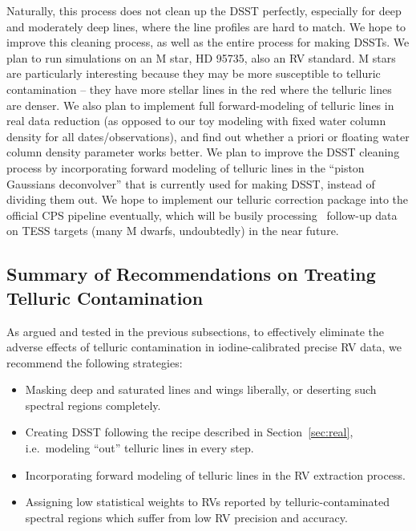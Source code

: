Naturally, this process does not clean up the DSST perfectly,
especially for deep and moderately deep lines, where the line profiles
are hard to match. We hope to improve this cleaning process, as well
as the entire process for making DSSTs. We plan
to run simulations on an M star, HD 95735, also an RV standard. M stars
are particularly interesting because they may be more susceptible to
telluric contamination -- they have more stellar lines in the red
where the telluric lines are denser. We also plan to implement full
forward-modeling of telluric lines in real data reduction (as opposed
to our toy modeling with fixed water column density for all
dates/observations), and find out whether a priori or floating water
column density parameter works better. We plan to improve the DSST
cleaning process by incorporating forward modeling of telluric lines
in the ``piston Gaussians deconvolver'' that is currently used for
making DSST, instead of dividing them out. We hope to implement our
telluric correction package into the official CPS pipeline eventually,
which will be busily processing \keck\ follow-up data on TESS targets
(many M dwarfs, undoubtedly) in the near future.


\subsection{Summary of Recommendations on Treating Telluric
  Contamination}\label{sec:summary} 

As argued and tested in the previous subsections, to effectively
eliminate the adverse effects of telluric contamination in
iodine-calibrated precise RV data, we recommend the following
strategies:
\begin{itemize}
  \item Masking deep and saturated lines and wings liberally, or
    deserting such spectral regions completely.
  \item Creating DSST following the recipe described in
    Section~\ref{sec:real}, i.e.\ modeling ``out'' telluric
    lines in every step. 
  \item Incorporating forward modeling of telluric lines in the RV
    extraction process.
  \item Assigning low statistical weights to RVs reported by
    telluric-contaminated spectral regions which suffer from low RV
    precision and accuracy.
\end{itemize}

